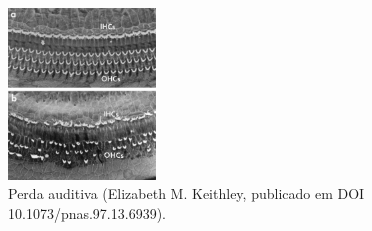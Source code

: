 \begin{frame}[allowframebreaks]
  \framebreak
  \vspace{-2ex}
  \begin{figure}[h]
  \centering
  \includegraphics[width=0.35\textwidth]{images/hearingloss.jpg}
  \caption{Perda auditiva (Elizabeth M. Keithley, publicado em DOI 10.1073/pnas.97.13.6939).}
  \label{fig-hearingloss}
  \end{figure}

\end{frame}

